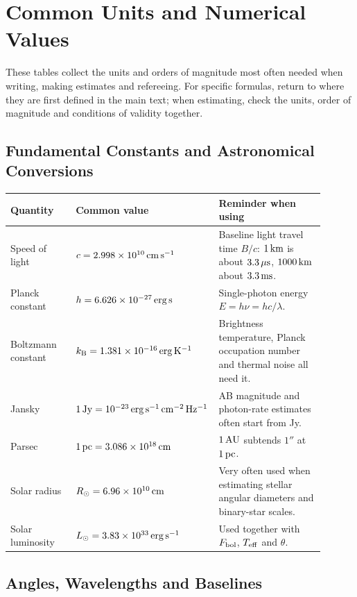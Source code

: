 \chapter{Common Units and Numerical Values}
\label{app:b}

These tables collect the units and orders of magnitude most often needed when writing, making estimates and refereeing. For specific formulas, return to where they are first defined in the main text; when estimating, check the units, order of magnitude and conditions of validity together.

\section{Fundamental Constants and Astronomical Conversions}
\label{appsec:b-constants}

\begin{longtable}{p{0.22\linewidth}p{0.30\linewidth}p{0.38\linewidth}}
\toprule
Quantity & Common value & Reminder when using \\
\midrule
Speed of light & \(c=2.998\times10^{10}\,{\rm cm\,s^{-1}}\) & Baseline light travel time \(B/c\): \(1\,{\rm km}\) is about \(3.3\,\mu{\rm s}\), \(1000\,{\rm km}\) about \(3.3\,{\rm ms}\). \\
Planck constant & \(h=6.626\times10^{-27}\,{\rm erg\,s}\) & Single-photon energy \(E=h\nu=hc/\lambda\). \\
Boltzmann constant & \(k_{\rm B}=1.381\times10^{-16}\,{\rm erg\,K^{-1}}\) & Brightness temperature, Planck occupation number and thermal noise all need it. \\
Jansky & \(1\,{\rm Jy}=10^{-23}\,{\rm erg\,s^{-1}\,cm^{-2}\,Hz^{-1}}\) & AB magnitude and photon-rate estimates often start from Jy. \\
Parsec & \(1\,{\rm pc}=3.086\times10^{18}\,{\rm cm}\) & \(1\,{\rm AU}\) subtends \(1''\) at \(1\,{\rm pc}\). \\
Solar radius & \(R_\odot=6.96\times10^{10}\,{\rm cm}\) & Very often used when estimating stellar angular diameters and binary-star scales. \\
Solar luminosity & \(L_\odot=3.83\times10^{33}\,{\rm erg\,s^{-1}}\) & Used together with \(F_{\rm bol}\), \(T_{\rm eff}\) and \(\theta\). \\
\bottomrule
\end{longtable}

\section{Angles, Wavelengths and Baselines}
\label{appsec:b-angle}

